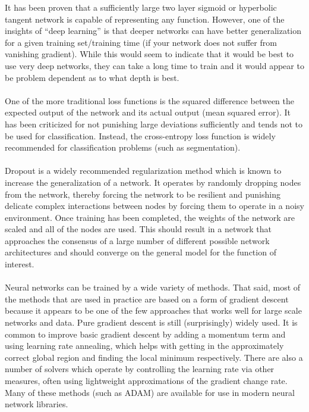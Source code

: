 \documentclass[12pt]{article}
\begin{document}
	It has been proven that a sufficiently large two layer sigmoid or hyperbolic tangent network is capable of representing any function.  However, one of the insights of “deep learning” is that deeper networks can have better generalization for a given training set/training time (if your network does not suffer from vanishing gradient).  While this would seem to indicate that it would be best to use very deep networks,  they can take a long time to train and it would appear to be problem dependent as to what depth is best.\\
\\
	One of the more traditional loss functions is the squared difference between the expected output of the network and its actual output (mean squared error).  It has been criticized for not punishing large deviations sufficiently and tends not to be used for classification.  Instead, the cross-entropy loss function is widely recommended for classification problems (such as segmentation).\\
\\
	Dropout is a widely recommended regularization method which is known to increase the generalization of a network.  It operates by randomly dropping nodes from the network, thereby forcing the network to be resilient and punishing delicate complex interactions between nodes by forcing them to operate in a noisy environment.  Once training has been completed, the weights of the network are scaled and all of the nodes are used.  This should result in a network that approaches the consensus of a large number of different possible network architectures and should converge on the general model for the function of interest.\\
\\
	Neural networks can be trained by a wide variety of methods.  That said, most of the methods that are used in practice are based on a form of gradient descent because it appears to be one of the few approaches that works well for large scale networks and data.  Pure gradient descent is still (surprisingly) widely used.  It is common to improve basic gradient descent by adding a momentum term and using learning rate annealing, which helps with getting in the approximately correct global region and finding the local minimum respectively. There are also a number of solvers which operate by controlling the learning rate via other measures, often using lightweight approximations of the gradient change rate.  Many of these methods (such as ADAM) are available for use in modern neural network libraries.\\
\end{document}
